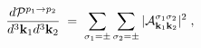 \begin{equation}
\frac{d{\cal P}^{p_1 \to p_2}}{d^3{\bf k}_1 d^3{\bf k}_2}\;=\;
\sum_{\sigma_1=\pm} \sum_{\sigma_2=\pm} \vert 
{\cal A}^{\sigma_1 \sigma_2}_{{\bf k}_1 {\bf k}_2} \vert^2 \;,
\label{dP1}
\end{equation}

